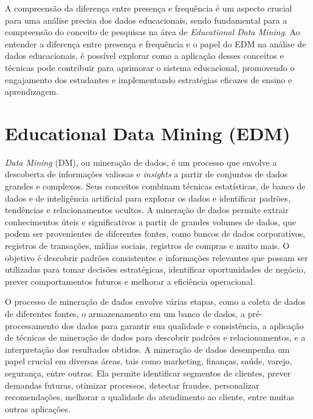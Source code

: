 A compreensão da diferença entre presença e frequência é um aspecto crucial para uma análise precisa dos dados educacionais, sendo fundamental para a compreensão do conceito de pesquisas na área de \textit{Educational Data Mining}. Ao entender a diferença entre presença e frequência e o papel do EDM na análise de dados educacionais, é possível explorar como a aplicação desses conceitos e técnicas pode contribuir para aprimorar o sistema educacional, promovendo o engajamento dos estudantes e implementando estratégias eficazes de ensino e aprendizagem.





  
\section{Educational Data Mining (EDM)}

\textit{Data Mining} (DM), ou mineração de dados, é um processo que envolve a descoberta de informações valiosas e \textit{insights} a partir de conjuntos de dados grandes e complexos. Seus conceitos combinam técnicas estatísticas, de banco de dados e de inteligência artificial para explorar os dados e identificar padrões, tendências e relacionamentos ocultos. A mineração de dados permite extrair conhecimentos úteis e significativos a partir de grandes volumes de dados, que podem ser provenientes de diferentes fontes, como bancos de dados corporativos, registros de transações, mídias sociais, registros de compras e muito mais. O objetivo é descobrir padrões consistentes e informações relevantes que possam ser utilizadas para tomar decisões estratégicas, identificar oportunidades de negócio, prever comportamentos futuros e melhorar a eficiência operacional.

O processo de mineração de dados envolve várias etapas, como a coleta de dados de diferentes fontes, o armazenamento em um banco de dados, a pré-processamento dos dados para garantir sua qualidade e consistência, a aplicação de técnicas de mineração de dados para descobrir padrões e relacionamentos, e a interpretação dos resultados obtidos. A mineração de dados desempenha um papel crucial em diversas áreas, tais como marketing, finanças, saúde, varejo, segurança, entre outras. Ela permite identificar segmentos de clientes, prever demandas futuras, otimizar processos, detectar fraudes, personalizar recomendações, melhorar a qualidade do atendimento ao cliente, entre muitas outras aplicações.

